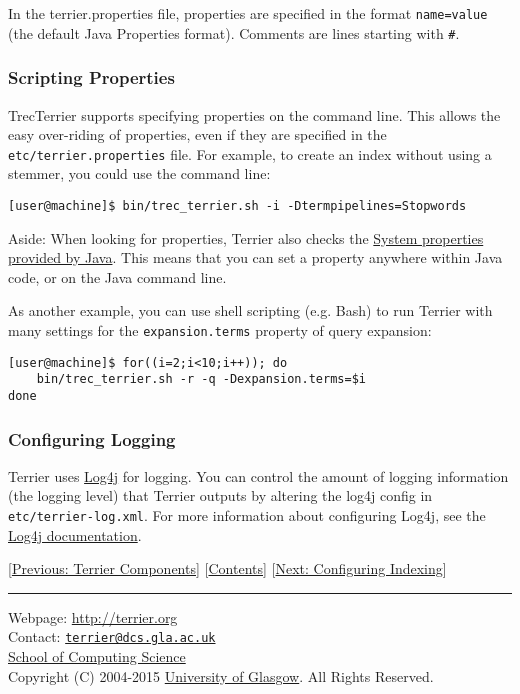 In the terrier.properties file, properties are specified in the format
\texttt{name=value} (the default Java Properties format). Comments are
lines starting with \texttt{\#}.

\subsubsection{Scripting Properties}\label{scripting-properties}

TrecTerrier supports specifying properties on the command line. This
allows the easy over-riding of properties, even if they are specified in
the \texttt{etc/terrier.properties} file. For example, to create an
index without using a stemmer, you could use the command line:

\begin{verbatim}
[user@machine]$ bin/trec_terrier.sh -i -Dtermpipelines=Stopwords
\end{verbatim}

Aside: When looking for properties, Terrier also checks the
\href{http://download.oracle.com/javase/tutorial/essential/environment/sysprop.html}{System
properties provided by Java}. This means that you can set a property
anywhere within Java code, or on the Java command line.

As another example, you can use shell scripting (e.g. Bash) to run
Terrier with many settings for the \texttt{expansion.terms} property of
query expansion:

\begin{verbatim}
[user@machine]$ for((i=2;i<10;i++)); do 
    bin/trec_terrier.sh -r -q -Dexpansion.terms=$i 
done
\end{verbatim}

\subsubsection{Configuring Logging}\label{configuring-logging}

Terrier uses \href{http://logging.apache.org/log4j/1.2/}{Log4j} for
logging. You can control the amount of logging information (the logging
level) that Terrier outputs by altering the log4j config in
\texttt{etc/terrier-log.xml}. For more information about configuring
Log4j, see the
\href{http://logging.apache.org/log4j/1.2/manual.html}{Log4j
documentation}.

{[}\href{basicComponents.html}{Previous: Terrier Components}{]}
{[}\href{index.html}{Contents}{]}
{[}\href{configure_indexing.html}{Next: Configuring Indexing}{]}

\begin{center}\rule{0.5\linewidth}{\linethickness}\end{center}

Webpage: \url{http://terrier.org}\\
Contact:
\href{mailto:terrier@dcs.gla.ac.uk}{\nolinkurl{terrier@dcs.gla.ac.uk}}\\
\href{http://www.dcs.gla.ac.uk/}{School of Computing Science}\\
Copyright (C) 2004-2015 \href{http://www.gla.ac.uk/}{University of
Glasgow}. All Rights Reserved.
